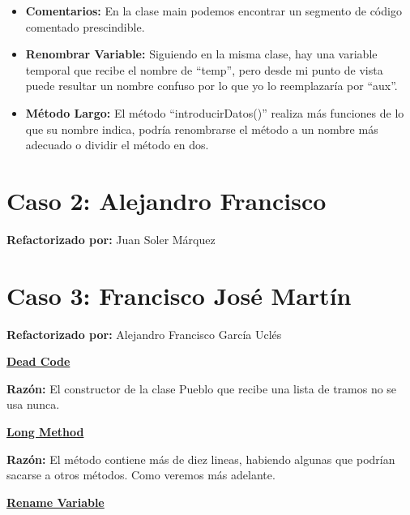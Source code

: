 \documentclass[11pt,a4paper,oneside]{book}
\begin{document}
\begin{itemize}
    \item \textbf{Comentarios: } En la clase main podemos encontrar un segmento de código comentado prescindible.
    
    
     \item \textbf{Renombrar Variable: } Siguiendo en la misma clase, hay una variable temporal que recibe el nombre de ``temp'', pero desde mi punto de vista puede resultar un nombre confuso por lo que yo lo reemplazaría por ``aux''.
     
     
      \item \textbf{Método Largo: } El método ``introducirDatos()'' realiza más funciones de lo que su nombre indica, podría renombrarse el método a un nombre más adecuado o dividir el método en dos.
          
  
\end{itemize}

\chapter{Caso 2: Alejandro Francisco}
\textbf{Refactorizado por:} Juan Soler Márquez \newline


\chapter {Caso 3: Francisco José Martín}
 \textbf{Refactorizado por:} Alejandro Francisco García Uclés \newline

    \hyperref[deadcode]{\textbf{Dead Code}}
    
    \textbf{Razón:} El constructor de la clase Pueblo que recibe una lista de tramos no se usa nunca.
    
    
    
    \hyperref[longmethod]{\textbf{Long Method}}
    
    \textbf{Razón:} El método contiene más de diez lineas, habiendo algunas que podrían sacarse a otros métodos. Como veremos más adelante.
    
    
    
    \hyperref[renamevariable]{\textbf{Rename Variable}}
    
\end{document}
